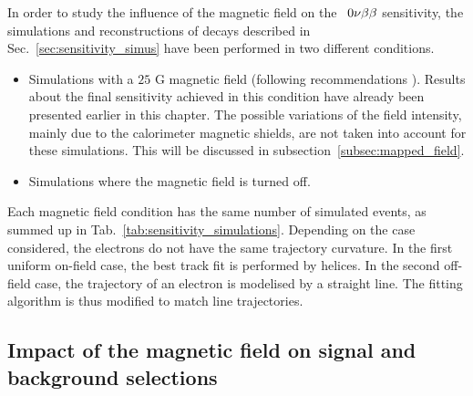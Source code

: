 In order to study the influence of the magnetic field on the \Se\ $0\nu\beta\beta$ sensitivity, the simulations and reconstructions of decays described in Sec.~\ref{sec:sensitivity_simus} have been performed in two different conditions.
\begin{itemize}
\item Simulations with a $25$ G magnetic field (following recommendations \cite{CalvezThesis}).
  Results about the final sensitivity achieved in this condition have already been presented earlier in this chapter.
  The possible variations of the field intensity, mainly due to the calorimeter magnetic shields, are not taken into account for these simulations.
  This will be discussed in subsection~\ref{subsec:mapped_field}.
\item Simulations where the magnetic field is turned off.
\end{itemize}
Each magnetic field condition has the same number of simulated events, as summed up in Tab.~\ref{tab:sensitivity_simulations}.
Depending on the case considered, the electrons do not have the same trajectory curvature.
In the first uniform on-field case, the best track fit is performed by helices.
In the second off-field case, the trajectory of an electron is modelised by a straight line.
The fitting algorithm is thus modified to match line trajectories.

\subsection{Impact of the magnetic field on signal and background selections}

